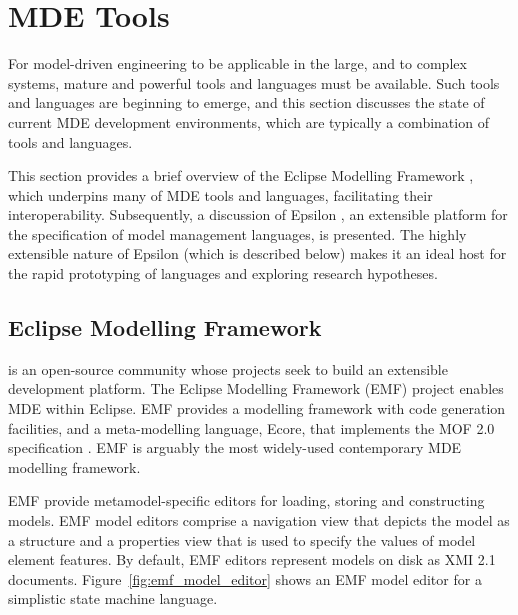 
\section{MDE Tools}
\label{sec:mde_tools}
For model-driven engineering to be applicable in the large, and to complex systems, mature and powerful tools and languages must be available. Such tools and languages are beginning to emerge, and this section discusses the state of current MDE development environments, which are typically a combination of tools and languages.


This section provides a brief overview of the Eclipse Modelling Framework \cite{emf}, which underpins many of MDE tools and languages, facilitating their interoperability. Subsequently, a discussion of Epsilon \cite{epsilon}, an extensible platform for the specification of model management languages, is presented. The highly extensible nature of Epsilon (which is described below) makes it an ideal host for the rapid prototyping of languages and exploring research hypotheses.  

\subsection{Eclipse Modelling Framework}
\label{subsec:emf}
\cite{eclipse} is an open-source community whose projects seek to build an extensible development platform. The Eclipse Modelling Framework (EMF) project \cite{emf} enables MDE within Eclipse. EMF provides a modelling framework with code generation facilities, and a meta-modelling language, Ecore, that implements the MOF 2.0 specification \cite{mof}. EMF is arguably the most widely-used contemporary MDE modelling framework.

EMF provide metamodel-specific editors for loading, storing and constructing models. EMF model editors comprise a navigation view that depicts the model as a structure and a properties view that is used to specify the values of model element features. By default, EMF editors represent models on disk as XMI 2.1 \cite{xmi21} documents.  Figure~\ref{fig:emf_model_editor} shows an EMF model editor for a simplistic state machine language. 

